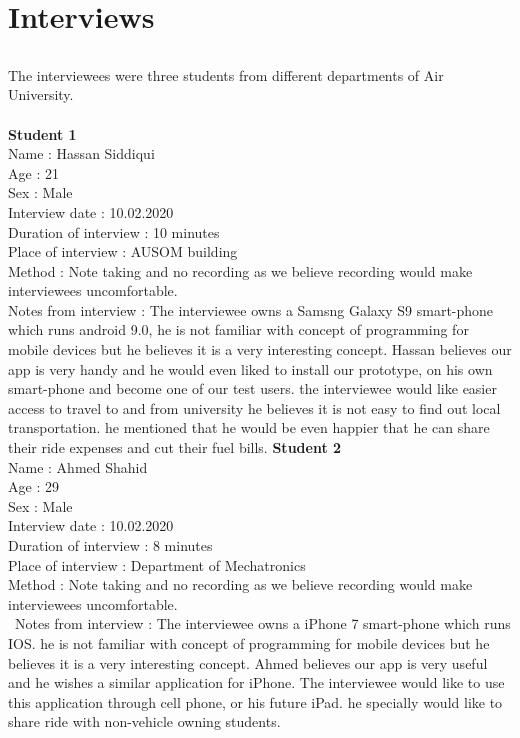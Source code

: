 \chapter{Interviews} \label{ap:Appendix1}

\section*{}
The interviewees were three students from different departments of Air University.\\~\\
\large {\textbf{Student 1 }}
\\ Name : Hassan Siddiqui 
\\ Age : 21 
\\ Sex : Male
\\ Interview date : 10.02.2020 
\\ Duration of interview : 10 minutes 
\\ Place of interview : AUSOM building 
\\ Method : Note taking and no recording as we believe recording would make interviewees uncomfortable.
\\ Notes from interview : The interviewee owns a Samsng Galaxy S9 smart-phone which runs android 9.0, he is not familiar with concept of programming for mobile devices but he believes it is a very interesting concept. Hassan believes our app is very handy and he would even liked to install our prototype, on his own smart-phone and become one of our test users. the interviewee would like easier access to travel to and from university he believes it is not easy to find out local transportation. he mentioned that he would be even happier that he can share their ride expenses and cut their fuel bills.\newpage
\large {\textbf{Student 2 }}
\\ Name : Ahmed Shahid
\\ Age : 29 
\\ Sex : Male
\\ Interview date : 10.02.2020 
\\ Duration of interview : 8 minutes 
\\ Place of interview : Department of Mechatronics
\\ Method : Note taking and no recording as we believe recording would make interviewees uncomfortable. \\\ Notes from interview : The interviewee owns a iPhone 7 smart-phone which runs IOS. he is not familiar with concept of programming for mobile devices but he believes it is a very interesting concept. Ahmed believes our app is very useful and he wishes a similar application for iPhone. The interviewee would like to use this application through cell phone, or his future iPad. he specially would like to share ride with non-vehicle owning students.\\~\\
